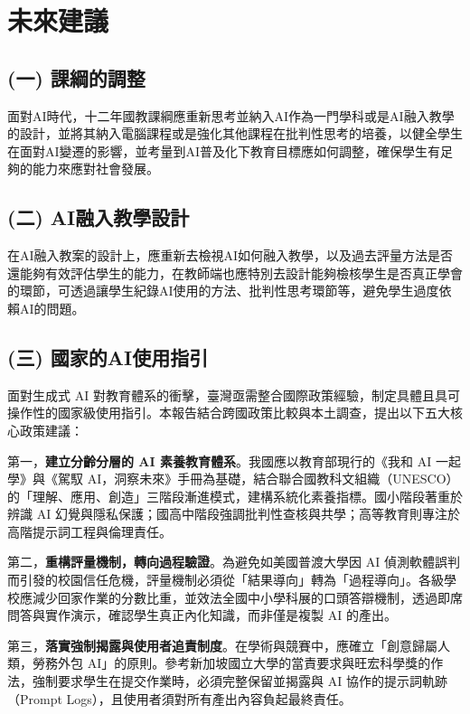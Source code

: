 \section{未來建議}\label{sec:未來建議}

\subsection{(一) 課綱的調整}\label{sec:未來建議一}

面對AI時代，十二年國教課綱應重新思考並納入AI作為一門學科或是AI融入教學的設計，並將其納入電腦課程或是強化其他課程在批判性思考的培養，以健全學生在面對AI變遷的影響，並考量到AI普及化下教育目標應如何調整，確保學生有足夠的能力來應對社會發展。

\subsection{(二) AI融入教學設計}\label{sec:未來建議二}

在AI融入教案的設計上，應重新去檢視AI如何融入教學，以及過去評量方法是否還能夠有效評估學生的能力，在教師端也應特別去設計能夠檢核學生是否真正學會的環節，可透過讓學生紀錄AI使用的方法、批判性思考環節等，避免學生過度依賴AI的問題。

\subsection{(三) 國家的AI使用指引}\label{sec:未來建議三}

面對生成式 AI 對教育體系的衝擊，臺灣亟需整合國際政策經驗，制定具體且具可操作性的國家級使用指引。本報告結合跨國政策比較與本土調查，提出以下五大核心政策建議：

第一，\textbf{建立分齡分層的 AI 素養教育體系}。我國應以教育部現行的《我和 AI 一起學》與《駕馭 AI，洞察未來》手冊為基礎\cite{govtw2024aiguide}，結合聯合國教科文組織（UNESCO）的「理解、應用、創造」三階段漸進模式\cite{unesco2024competency}，建構系統化素養指標。國小階段著重於辨識 AI 幻覺與隱私保護；國高中階段強調批判性查核與共學；高等教育則專注於高階提示詞工程與倫理責任。

第二，\textbf{重構評量機制，轉向過程驗證}。為避免如美國普渡大學因 AI 偵測軟體誤判而引發的校園信任危機\cite{arun2026ai}，評量機制必須從「結果導向」轉為「過程導向」。各級學校應減少回家作業的分數比重，並效法全國中小學科展的口頭答辯機制\cite{nehs2025science}，透過即席問答與實作演示，確認學生真正內化知識，而非僅是複製 AI 的產出。

第三，\textbf{落實強制揭露與使用者追責制度}。在學術與競賽中，應確立「創意歸屬人類，勞務外包 AI」的原則。參考新加坡國立大學的當責要求\cite{nus2024integrity}與旺宏科學獎的作法\cite{mxic2025competition}，強制要求學生在提交作業時，必須完整保留並揭露與 AI 協作的提示詞軌跡（Prompt Logs），且使用者須對所有產出內容負起最終責任。

